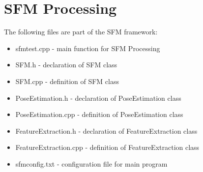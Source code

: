 \documentclass[12pt]{article}
\begin{document}
\section{SFM Processing}
The following files are part of the SFM framework:
\begin{itemize}
\item{sfmtest.cpp} - main function for SFM Processing
\item{SFM.h} - declaration of SFM class
\item{SFM.cpp} - definition of SFM class
\item{PoseEstimation.h} - declaration of PoseEstimation class
\item{PoseEstimation.cpp} - definition of PoseEstimation class
\item{FeatureExtraction.h} - declaration of FeatureExtraction class
\item{FeatureExtraction.cpp} - definition of FeatureExtraction class
\item{sfmconfig.txt} - configuration file for main program
\end{itemize}
\end{document}
